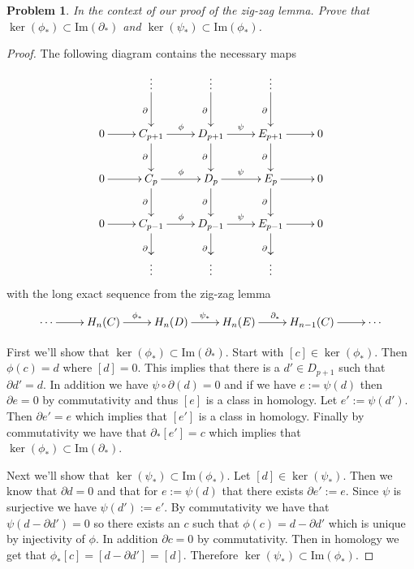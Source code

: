 \documentclass[10pt]{article}
\theoremstyle{plain}
\newtheorem{problem}{Problem}
\theoremstyle{remark}
\begin{document}
\begin{problem}
  In the context of our proof of the zig-zag lemma.
  Prove that $\ker(\phi_\ast) \subset \mathrm{Im}(\partial_\ast)$ and $\ker(\psi_\ast) \subset \mathrm{Im}(\phi_\ast)$.
\end{problem}

\begin{proof}
  The following diagram contains the necessary maps
  \[
    \xymatrix{
      & \vdots \ar[d]_\partial & \vdots \ar[d]_\partial & \vdots \ar[d]_\partial & \\
      0 \ar[r] & C_{p+1} \ar[r]^\phi \ar[d]_\partial & D_{p+1} \ar[r]^{\psi}\ar[d]_\partial
      & E_{p+1}  \ar[d]_\partial \ar[r] & 0\\
      0 \ar[r] & C_{p} \ar[r]^\phi \ar[d]_\partial & D_{p} \ar[r]^{\psi}\ar[d]_\partial
      & E_{p}  \ar[d]_\partial \ar[r] & 0\\
      0 \ar[r] & C_{p-1} \ar[r]^\phi \ar[d]_\partial & D_{p-1} \ar[r]^{\psi}\ar[d]_\partial
      & E_{p-1}  \ar[d]_\partial \ar[r] & 0\\
      & \vdots & \vdots & \vdots &
    }
  \]
  with the long exact sequence from the zig-zag lemma
  \[
    \xymatrix{
      \cdots \ar[r] & H_n(C) \ar[r]^{\phi_*} & H_n(D) \ar[r]^{\psi_*} & H_n(E) \ar[r]^{\partial_*}
      & H_{n-1}(C)\ar[r] & \cdots
    }
  \]

  First we'll show that $\ker(\phi_*)\subset\mathrm{Im}(\partial_*)$. Start with $[c]\in\ker(\phi_*)$.
  Then $\phi(c)=d$ where $[d]=0$. This implies that there is a $d'\in D_{p+1}$ such
  that $\partial d'=d$. In addition we have $\psi\circ\partial(d)=0$ and if we have $e:=\psi(d)$ then
  $\partial e =0$ by commutativity and thus $[e]$ is a class in homology. Let
  $e':=\psi(d')$. Then $\partial e' = e$ which implies that $[e']$ is a class in homology.
  Finally by commutativity we have that $\partial_*[e']=c$ which implies that
  $\ker(\phi_*)\subset\mathrm{Im}(\partial_*)$.

  Next we'll show that $\ker(\psi_*)\subset\mathrm{Im}(\phi_*)$. Let $[d]\in \ker(\psi_*)$. Then
  we know that $\partial d=0$ and that for $e:=\psi(d)$ that there exists $\partial e':= e$.
  Since $\psi$ is surjective we have $\psi(d'):=e'$. By commutativity we have
  that $\psi(d-\partial d')=0$ so there exists an $c$ such that $\phi(c)=d-\partial d'$ which is
  unique by injectivity of $\phi$. In addition $\partial c=0$ by commutativity.
  Then in homology we get that $\phi_*[c] = [d-\partial d']=[d]$. Therefore
  $\ker(\psi_*)\subset\mathrm{Im}(\phi_*)$.
\end{proof}
\end{document}
